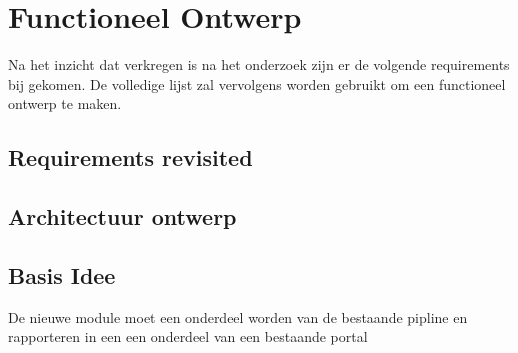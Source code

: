 
\chapter{Functioneel Ontwerp} %

\label{funtioneelOntwerp} %


Na het inzicht dat verkregen is na het onderzoek zijn er de volgende requirements bij gekomen. De volledige lijst zal vervolgens worden gebruikt om een functioneel ontwerp te maken.

\section{Requirements revisited}

\section{Architectuur ontwerp}
\section{}
\section{Basis Idee}
De nieuwe module moet een onderdeel worden van de bestaande pipline en rapporteren in een een onderdeel van een bestaande portal
